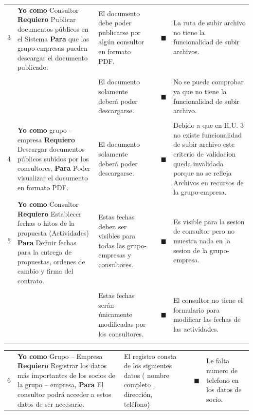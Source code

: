 \documentclass[letterpaper,11pt]{article}
\begin{document}
\begin{landscape}
\begin{tabular}{|c|p{5cm}|p{7.5cm}|c|c|p{7.5cm}|}
			3 & \multirow{2}{5cm}{\textbf{Yo como} Consultor \textbf{Requiero} Publicar documentos públicos en el Sistema \textbf{Para} que las grupo-empresas pueden descargar el documento publicado.} & El documento debe poder publicarse por algún consultor en formato PDF. &  & $\blacksquare$ & La ruta de subir archivo no tiene la funcionalidad de subir archivos. \\ 
			& & & & & \\ \cline{3-6}
			& & & & & \\
			& & El documento solamente deberá poder descargarse. & & $\blacksquare$ &  No se puede comprobar ya que no tiene la funcionalidad de subir archivo.\\ 
			& & & & & \\ \hline
			4 & \textbf{Yo como} grupo – empresa \textbf{Requiero} Descargar documentos públicos subidos por los consultores, \textbf{Para} Poder visualizar el documento en formato PDF. & El documento solamente deberá poder descargarse. & & $\blacksquare$ & Debido a que en  H.U. 3 no existe funcionalidad de subir archivo este criterio de validacion queda invalidada porque no se refleja Archivos en recursos de la grupo-empresa. \\ \hline
			5 & \multirow{2}{5cm}{\textbf{Yo como} Consultor \textbf{Requiero} Establecer fechas o hitos de la propuesta (Actividades) \textbf{Para} Definir fechas para la entrega de propuestas, ordenes de cambio y firma del contrato.} & Estas fechas deben ser visibles para todas las grupo-empresas y consultores. & & $\blacksquare$ & Es visible para la sesion de consultor pero no muestra nada en la sesion de la grupo-empresa. \\ 
			& & & & & \\ \cline{3-6}
			& & & & & \\
			& & Estas fechas serán únicamente modificadas por los consultores. & & $\blacksquare$ & El consultor no tiene el formulario para modificar las fechas de las actividades.\\
			& & & & & \\ \hline
		\end{tabular}
		\newpage
		\begin{tabular}{|c|p{5cm}|p{7.5cm}|c|c|p{7.5cm}|}
			\hline
				6 & \multirow{3}{5cm}{\textbf{Yo como} Grupo – Empresa \textbf{Requiero} Registrar los datos más importantes de los socios de la grupo – empresa, \textbf{Para} El consultor podrá acceder a estos datos de ser necesario.} & El registro consta de los siguientes datos ( nombre completo , dirección, teléfono) &	& $\blacksquare$ & Le falta numero de telefono en los datos de socio. \\ \cline{3-6}

\end{tabular}
\end{landscape}
\end{document}

